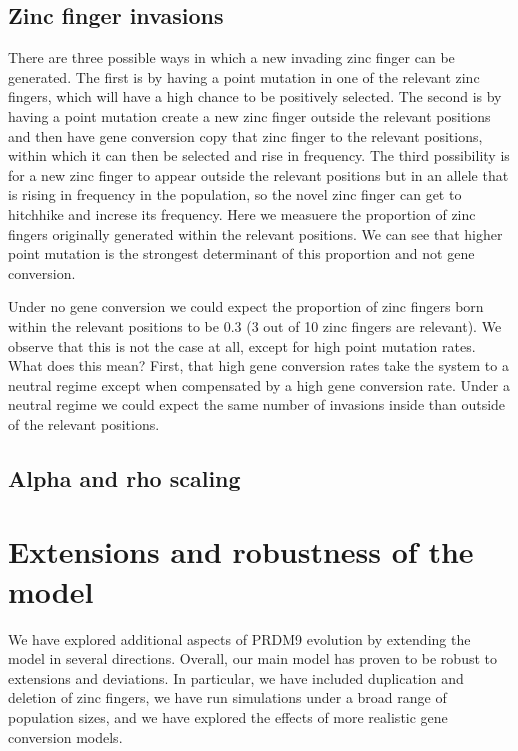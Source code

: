 \documentclass[a4paper,10pt]{article}
\begin{document}




\subsection{Zinc finger invasions}
There are three possible ways in which a new invading zinc finger can be generated. The first is by having a point mutation in one of the relevant zinc fingers, which will have a high chance to be positively selected. The second is by having a point mutation create a new zinc finger outside the relevant positions and then have gene conversion copy that zinc finger to the relevant positions, within which it can then be selected and rise in frequency. The third possibility is for a new zinc finger to appear outside the relevant positions but in an allele that is rising in frequency in the population, so the novel zinc finger can get to hitchhike and increse its frequency. Here we measuere the proportion of zinc fingers originally generated within the relevant positions. We can see that higher point mutation is the strongest determinant of this proportion and not gene conversion. 

Under no gene conversion we could expect the proportion of zinc fingers born within the relevant positions to be 0.3 (3 out of 10 zinc fingers are relevant). We observe that this is not the case at all, except for high point mutation rates. What does this mean? First, that high gene conversion rates take the system to a neutral regime except when compensated by a high gene conversion rate. Under a neutral regime we could expect the same number of invasions inside than outside of the relevant positions. 

\subsection{Alpha and rho scaling}


\section{Extensions and robustness of the model}

We have explored additional aspects of PRDM9 evolution by extending the model in several directions. Overall, our main model has proven to be robust to extensions and deviations. In particular, we have included duplication and deletion of zinc fingers, we have run simulations under a broad range of population sizes, and we have explored the effects of more realistic gene conversion models. 
\end{document}
